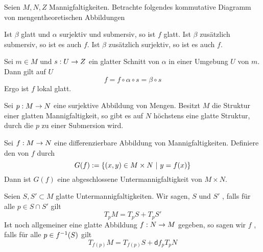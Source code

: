 \documentclass{book}
\renewcommand{\d}{\textsf{d}}
\begin{document}
\Lem{}
Seien $M,N,Z$ Mannigfaltigkeiten. Betrachte folgendes kommutative Diagramm von mengentheoretischen Abbildungen
\begin{center}
\end{center}
Ist $\beta$ glatt und $\alpha$ surjektiv und submersiv, so ist $f$ glatt. Ist $\beta$ zusätzlich submersiv, so ist es auch $f$. Ist $\beta$ zusätzlich surjektiv, so ist es auch $f$.
\begin{Beweis}{}
Sei $m \in M$ und $s : U \overset{}{\rightarrow} Z$ ein glatter Schnitt von $\alpha$ in einer Umgebung $U$ von $m$. Dann gilt auf $U$
\[ f =  f\circ \alpha \circ s = \beta \circ s \]
Ergo ist $f$ lokal glatt.
\end{Beweis}

\Kor{}
Sei $p : M \overset{}{\rightarrow} N$ eine surjektive Abbildung von Mengen. Besitzt $M$ die Struktur einer glatten Mannigfaltigkeit, so gibt es auf $N$ höchstens eine glatte Struktur, durch die $p$ zu einer Submersion wird.

\Prop{}
Sei $f : M \overset{}{\rightarrow} N$ eine differenzierbare Abbildung von Mannigfaltigkeiten. Definiere den  von $f$ durch
\[G(f) := \set{ (x,y) \in M\times N }{y = f(x)}\]
Dann ist $G(f)$ eine abgeschlossene Untermannigfaltigkeit von $M\times N$.

\Def{}
Seien $S,S' \subset M$ glatte Untermannigfaltigkeiten. Wir sagen, $S$ und $S'$ , falls für alle $p \in S\cap S'$ gilt
\[ T_pM = T_pS + T_pS' \]
Ist noch allgemeiner eine glatte Abbildung $f : N \overset{}{\rightarrow} M$ gegeben, so sagen wir $f$ , falls für alle $p \in f^{-1}(S)$ gilt
\[ T_{f(p)}M = T_{f(p)}S + \d f_{p} T_pN  \]
\end{document}
